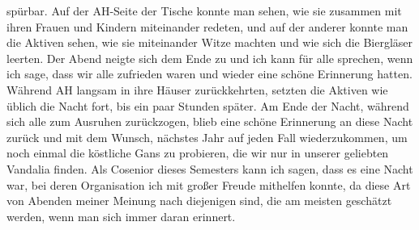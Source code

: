 \begin{multicols}{2}
spürbar. Auf der AH-Seite der Tische konnte man sehen, wie sie zusammen mit ihren Frauen und Kindern miteinander redeten, und auf der anderer konnte man die Aktiven sehen, wie sie miteinander Witze machten und wie sich die Biergläser leerten. Der Abend neigte sich dem Ende zu und ich kann für alle sprechen, wenn ich sage, dass wir alle zufrieden waren und wieder eine schöne Erinnerung hatten. Während AH langsam in ihre Häuser zurückkehrten, setzten die Aktiven wie üblich die Nacht fort, bis ein paar Stunden später. Am Ende der Nacht, während sich alle zum Ausruhen zurückzogen, blieb eine schöne Erinnerung an diese Nacht zurück und mit dem Wunsch, nächstes Jahr auf jeden Fall wiederzukommen, um noch einmal die köstliche Gans zu probieren, die wir nur in unserer geliebten Vandalia finden. Als Cosenior dieses Semesters kann ich sagen, dass es eine Nacht war, bei deren Organisation ich mit großer Freude mithelfen konnte, da diese Art von Abenden meiner Meinung nach diejenigen sind, die am meisten geschätzt werden, wenn man sich immer daran erinnert.
\end{multicols}
	
